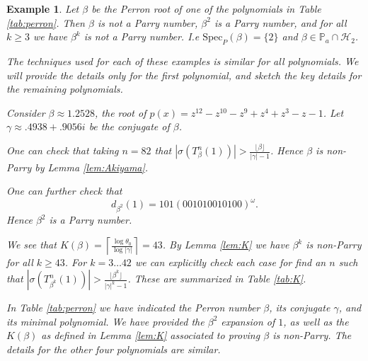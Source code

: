 \documentclass[12pt]{article}
\theoremstyle{plain}
\newtheorem{example}[theorem]{Example}
\theoremstyle{remark}
\newcommand{\SpecP}{\mathrm{Spec}_{P}}
\begin{document}
\begin{example}
 \label{cor:Solomyak}
 Let $\beta$ be the Perron root of one of the polynomials in Table \ref{tab:perron}. 
 Then $\beta$ is not a Parry number, $\beta^2$ is a Parry number, and for all $k \geq 3$ we have $\beta^k$ is not a Parry number. 
 I.e $\SpecP(\beta) = \{2\}$ and $\beta \in \mathbb{P}_a \cap \mathcal{H}_2$.

 The techniques used for each of these examples is similar for all polynomials.
 We will provide the details only for the first polynomial, and sketch the key details for the remaining polynomials.

 Consider $\beta \approx 1.2528$, the root of $p(x) = z^{12}-z^{10}-z^9+z^4+z^3-z-1$.
 Let $\gamma \approx .4938 +.9056 i$ be the conjugate of $\beta$.

 One can check that taking $n = 82$ that $|\sigma(T^n_\beta(1))| > \frac{\lfloor \beta \rfloor}{|\gamma|-1}$.
 Hence $\beta$ is non-Parry by Lemma \ref{lem:Akiyama}.

 One can further check that 
 \[ d_{\beta^2}(1) = 1 0 1 (0 0 1 0 1 0 0 1 0 1 0 0)^{\omega}.\]
 Hence $\beta^2$ is a Parry number.

 We see that $K(\beta) = \left \lceil \frac{\log \theta_0}{\log |\gamma|}\right\rceil = 43$.
 By Lemma \ref{lem:K} we have $\beta^k$ is non-Parry for all $k \geq 43$. 
 For $k = 3 \dots 42$ we can explicitly check each case for find an $n$ such that $\left|\sigma(T^n_{\beta^k}(1))\right| > \frac{\lfloor \beta^k \rfloor}{|\gamma|^k -1}$.
 These are summarized in Table \ref{tab:K}.

 In Table \ref{tab:perron} we have indicated the Perron number $\beta$, its conjugate $\gamma$, and its minimal polynomial.
 We have provided the $\beta^2$ expansion of $1$, as well as the $K(\beta)$ as defined in Lemma \ref{lem:K} associated to proving $\beta$ is non-Parry. 
The details for the other four polynomials are similar.


\end{example}
\end{document}
